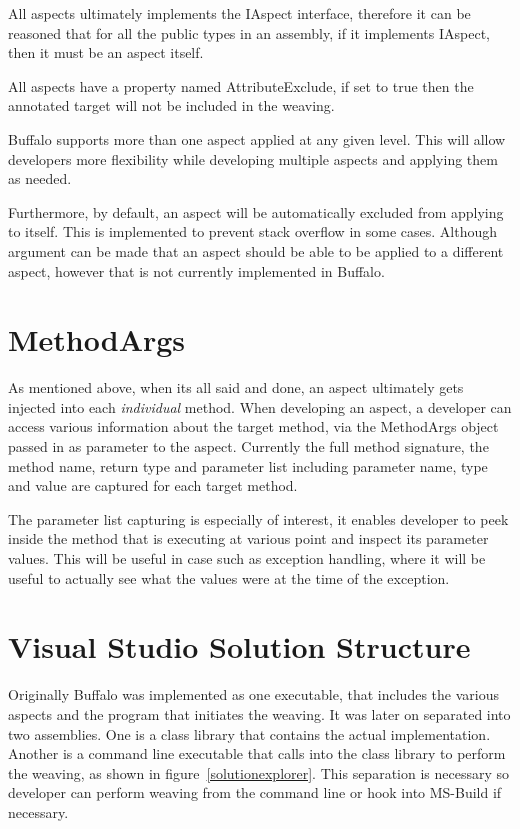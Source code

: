 All aspects ultimately implements the IAspect interface, therefore it can be reasoned that for all the public types in an assembly, if it implements IAspect, then it must be an aspect itself.

All aspects have a property named AttributeExclude, if set to true then the annotated target will not be included in the weaving.

Buffalo supports more than one aspect applied at any given level. This will allow developers more flexibility while developing multiple aspects and applying them as needed.

Furthermore, by default, an aspect will be automatically excluded from applying to itself. This is implemented to prevent stack overflow in some cases. Although argument can be made that an aspect should be able to be applied to a different aspect, however that is not currently implemented in Buffalo.

\section{MethodArgs}

As mentioned above, when its all said and done, an aspect ultimately gets injected into each \textit{individual} method. When developing an aspect, a developer can access various information about the target method, via the MethodArgs object passed in as parameter to the aspect. Currently the full method signature, the method name, return type and parameter list including parameter name, type and value are captured for each target method.

The parameter list capturing is especially of interest, it enables developer to peek inside the method that is executing at various point and inspect its parameter values. This will be useful in case such as exception handling, where it will be useful to actually see what the values were at the time of the exception.

\section{Visual Studio Solution Structure}

Originally Buffalo was implemented as one executable, that includes the various aspects and the program that initiates the weaving. It was later on separated into two assemblies. One is a class library that contains the actual implementation. Another is a command line executable that calls into the class library to perform the weaving, as shown in figure~\ref{solutionexplorer}. This separation is necessary so developer can perform weaving from the command line or hook into MS-Build if necessary. 

